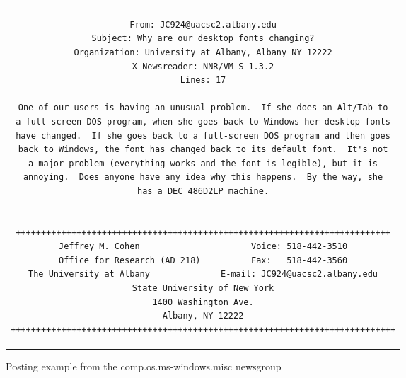 \documentclass[sigconf]{acmart}
\begin{document}
\begin{figure}
	\label{fig:post}
	\begin{center}
		\begin{tabular}{c}
			\begin{lstlisting}[basicstyle=\footnotesize]
From: JC924@uacsc2.albany.edu
Subject: Why are our desktop fonts changing?
Organization: University at Albany, Albany NY 12222
X-Newsreader: NNR/VM S_1.3.2
Lines: 17

One of our users is having an unusual problem.  If she does an Alt/Tab to
a full-screen DOS program, when she goes back to Windows her desktop fonts
have changed.  If she goes back to a full-screen DOS program and then goes
back to Windows, the font has changed back to its default font.  It's not
a major problem (everything works and the font is legible), but it is
annoying.  Does anyone have any idea why this happens.  By the way, she
has a DEC 486D2LP machine.


++++++++++++++++++++++++++++++++++++++++++++++++++++++++++++++++++++++++++
Jeffrey M. Cohen                      Voice: 518-442-3510
Office for Research (AD 218)          Fax:   518-442-3560
The University at Albany              E-mail: JC924@uacsc2.albany.edu
State University of New York
1400 Washington Ave.
Albany, NY 12222
++++++++++++++++++++++++++++++++++++++++++++++++++++++++++++++++++++++++++++
			\end{lstlisting}
		\end{tabular}
	\end{center}
	\caption{Posting example from the comp.os.ms-windows.misc newsgroup}
\end{figure}
\end{document}
